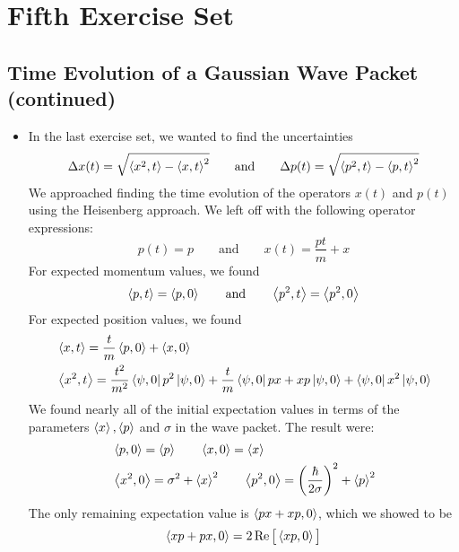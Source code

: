 \documentclass[11pt, a4paper]{article}
\newcommand{\eqtext}[1]{\qquad \text{#1} \qquad}
\begin{document}
\begin{itemize}
\end{itemize}


\section{Fifth Exercise Set}

\subsection{Time Evolution of a Gaussian Wave Packet (continued)}
\begin{itemize}
	\item In the last exercise set, we wanted to find the uncertainties
	\begin{equation*}
		\Delta x(t) = \sqrt{\ev{x^{2}, t} - \ev{x, t}^{2}} \eqtext{and} \Delta p(t) = \sqrt{\ev{p^{2}, t} - \ev{p, t}^{2}}
	\end{equation*}
	We approached finding the time evolution of the operators $ x(t) $ and $ p(t) $ using the Heisenberg approach. We left off with the following operator expressions:
	\begin{equation*}
		p(t) = p \eqtext{and} x(t) = \frac{pt}{m} + x
	\end{equation*}
	For expected momentum values, we found
	\begin{equation*}
		\ev{p, t} = \ev{p, 0} \eqtext{and} \ev{p^{2}, t} = \ev{p^{2}, 0}
	\end{equation*}
	For expected position values, we found
	\begin{align*}
		&\ev{x, t} = \frac{t}{m} \ev{p, 0} + \ev{x, 0}\\
		&\ev{x^{2}, t} = \frac{t^{2}}{m^{2}}\bra{\psi, 0} p^{2} \ket{\psi, 0} + \frac{t}{m}\bra{\psi, 0} px + xp \ket{\psi, 0} + \bra{\psi, 0} x^{2} \ket{\psi, 0}
	\end{align*}
	We found nearly all of the initial expectation values in terms of the parameters $ \ev{x}, \ev{p} $ and $ \sigma $ in the wave packet. The result were:
	\begin{align*}
		&\ev{p, 0} = \ev{p} \qquad \ev{x, 0} = \ev{x}\\
		&\ev{x^{2}, 0} = \sigma^{2} + \ev{x}^{2} \qquad \ev{p^{2}, 0} = \left(\frac{\hbar}{2\sigma}\right)^{2} + \ev{p}^{2}
	\end{align*}
	The only remaining expectation value is $ \ev{px + xp, 0} $, which we showed to be
	\begin{equation*}
		\ev{xp + px, 0} = 2\Re \big[\ev{xp, 0}\big]
	\end{equation*}

\end{itemize}
\end{document}
